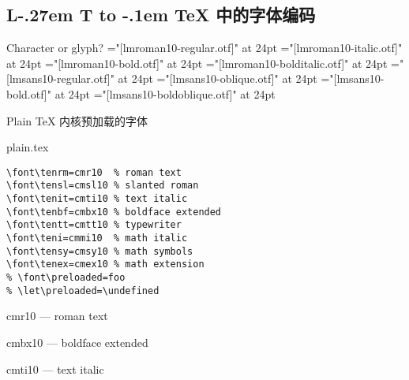\documentclass{beamer}
\makeatletter
\DeclareRobustCommand\LaTeX{L\kern-.27em%
  {\sbox\z@ T%
   \vbox to\ht\z@{\hbox{\check@mathfonts
                        \fontsize\sf@size\z@
                        \math@fontsfalse\selectfont
                        A}%
                  \vss}%
  }%
  \kern-.1em%
  \TeX}
\makeatother
\begin{document}
\begin{frame}
\section{\LaTeX{} 中的字体编码}
\end{frame}

\begin{frame}{Character or glyph?}
\centering
\font\0="[lmroman10-regular.otf]"    at 24pt
\font\1="[lmroman10-italic.otf]"     at 24pt
\font\2="[lmroman10-bold.otf]"       at 24pt
\font\3="[lmroman10-bolditalic.otf]" at 24pt
\font\4="[lmsans10-regular.otf]"     at 24pt
\font\5="[lmsans10-oblique.otf]"     at 24pt
\font\6="[lmsans10-bold.otf]"        at 24pt
\font\7="[lmsans10-boldoblique.otf]" at 24pt
\end{frame}

\begin{frame}[fragile]{Plain \TeX{} 内核预加载的字体}
\begin{exampleblock}{plain.tex}
\begin{verbatim}
\font\tenrm=cmr10  % roman text
\font\tensl=cmsl10 % slanted roman
\font\tenit=cmti10 % text italic
\font\tenbf=cmbx10 % boldface extended
\font\tentt=cmtt10 % typewriter
\font\teni=cmmi10  % math italic
\font\tensy=cmsy10 % math symbols
\font\tenex=cmex10 % math extension
% \font\preloaded=foo
% \let\preloaded=\undefined
\end{verbatim}
\end{exampleblock}
\end{frame}

\begin{frame}{cmr10 --- roman text}
\end{frame}

\begin{frame}{cmbx10 --- boldface extended}
\end{frame}

\begin{frame}{cmti10 --- text italic}
\end{frame}
\end{document}
